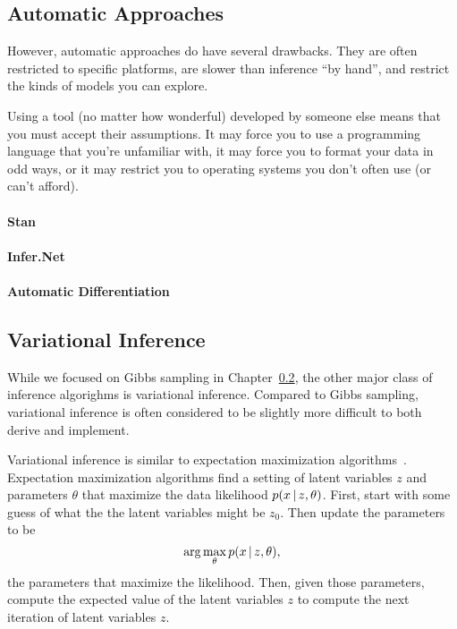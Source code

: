 \subsection{Automatic Approaches}

However, automatic approaches do have several drawbacks.  They are
often restricted to specific platforms, are slower than inference ``by
hand'', and restrict the kinds of models you can explore.

Using a tool (no matter how wonderful) developed by someone else means
that you must accept their assumptions.  It may force you to use a
programming language that you're unfamiliar with, it may force you to
format your data in odd ways, or it may restrict you to operating
systems you don't often use (or can't afford).


\paragraph{Stan}


\paragraph{Infer.Net}



\paragraph{Automatic Differentiation}



\subsection{Variational Inference}

While we focused on Gibbs sampling in Chapter~\ref{}, the other major
class of inference algorighms is variational inference.  Compared to
Gibbs sampling, variational inference is often considered to be
slightly more difficult to both derive and implement.

Variational inference is similar to expectation maximization
algorithms~\cite{}.  Expectation maximization algorithms find a
setting of latent variables $z$ and parameters $\theta$ that maximize
the data likelihood $p(x \, | \, z, \theta)$.  First, start with some guess
of what the the latent variables might be $z_0$.  Then update the
parameters to be
\begin{equation}
  \arg \max_{\theta} p(x \, | \, z, \theta),
\label{eq:em}
\end{equation}
the parameters that maximize the likelihood.  Then, given those
parameters, compute the expected value of the latent variables $z$ to
compute the next iteration of latent variables $z$.

